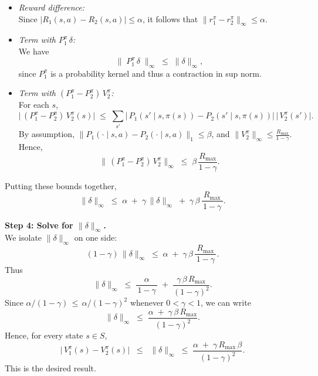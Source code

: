 \begin{itemize}
  \item \textit{Reward difference:}\\
    Since $\bigl|R_{1}(s,a) - R_{2}(s,a)\bigr|\le\alpha$, it follows that
    \(
       \|r_{1}^{\pi}-r_{2}^{\pi}\|_\infty \le \alpha.
    \)

  \item \textit{Term with $P_{1}^{\pi}\,\delta$:}\\
    We have
    \[
      \bigl\|\;P_{1}^{\pi}\,\delta\;\bigr\|_{\infty}
      \;\le\; \|\delta\|_{\infty},
    \]
    since $P_{1}^{\pi}$ is a probability kernel and thus a contraction in sup norm.

  \item \textit{Term with $(P_{1}^{\pi}-P_{2}^{\pi})\,V_{2}^{\pi}$:}\\
    For each $s$,
    \[
      \bigl|\,(P_{1}^{\pi}-P_{2}^{\pi})\,V_{2}^{\pi}(s)\bigr|
      \;\le\;
      \sum_{s'}\bigl|\,P_{1}(s'\mid s,\pi(s)) - P_{2}(s'\mid s,\pi(s))\bigr|\,
      \bigl|\,V_{2}^{\pi}(s')\bigr|.
    \]
    By assumption, $\|P_{1}(\cdot\mid s,a)-P_{2}(\cdot\mid s,a)\|_{1}\le\beta$, 
    and $\|V_{2}^{\pi}\|_{\infty}\le\frac{R_{\max}}{1-\gamma}$. Hence,
    \[
      \bigl\|\,(P_{1}^{\pi}-P_{2}^{\pi})\,V_{2}^{\pi}\bigr\|_{\infty}
      \;\le\;\beta\,\frac{R_{\max}}{1-\gamma}.
    \]
\end{itemize}

Putting these bounds together,
\[
  \|\delta\|_{\infty}
  \;\le\;
  \alpha
  \;+\;\gamma\,\|\delta\|_{\infty}
  \;+\;\gamma\,\beta\,\frac{R_{\max}}{\,1-\gamma\,}.
\]

\bigskip
\noindent
\textbf{Step 4: Solve for $\|\delta\|_{\infty}$.}\\
We isolate $\|\delta\|_{\infty}$ on one side:
\[
  (1-\gamma)\,\|\delta\|_{\infty}
  \;\le\;
  \alpha
  \;+\;
  \gamma\,\beta\,\frac{R_{\max}}{\,1-\gamma\,}.
\]
Thus
\[
  \|\delta\|_{\infty}
  \;\le\;
  \frac{\alpha}{\,1-\gamma\,}
  \;+\;
  \frac{\gamma\,\beta\,R_{\max}}{(1-\gamma)^2}.
\]
Since $\alpha/(1-\gamma)\,\le\,\alpha/(1-\gamma)^2$ whenever $0<\gamma<1$, we can write 
\[
  \|\delta\|_{\infty}
  \;\le\;
  \frac{\alpha\;+\;\gamma\,\beta\,R_{\max}}{(1-\gamma)^2}.
\]
Hence, for every state $s \in S$,
\[
  \bigl|\,V_{1}^{\pi}(s)-V_{2}^{\pi}(s)\bigr|
  \;\;\le\;\;
  \|\delta\|_{\infty}
  \;\le\;
  \frac{\alpha\;+\;\gamma\,R_{\max}\,\beta}{(1-\gamma)^2}.
\]
This is the desired result.